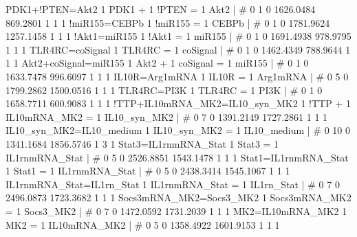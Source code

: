 PDK1+!PTEN=Akt2                                     	1 PDK1 + 1 !PTEN = 1 Akt2 	| 	# 	0              1              0      1626.0484       869.2801              1              1              1 
!miR155=CEBPb                                       	1 !miR155 = 1 CEBPb 	| 	# 	0              1              0      1781.9624      1257.1458              1              1              1 
!Akt1=miR155                                        	1 !Akt1 = 1 miR155 	| 	# 	0              1              0      1691.4938       978.9795              1              1              1 
TLR4RC=coSignal                                     	1 TLR4RC = 1 coSignal 	| 	# 	0              1              0      1462.4349       788.9644              1              1              1 
Akt2+coSignal=miR155                                	1 Akt2 + 1 coSignal = 1 miR155 	| 	# 	0              1              0      1633.7478       996.6097              1              1              1 
IL10R=Arg1mRNA                                      	1 IL10R = 1 Arg1mRNA 	| 	# 	0              5              0      1799.2862      1500.0516              1              1              1 
TLR4RC=PI3K                                         	1 TLR4RC = 1 PI3K 	| 	# 	0              1              0      1658.7711       600.9083              1              1              1 
!TTP+IL10mRNA_MK2=IL10_syn_MK2                      	1 !TTP + 1 IL10mRNA_MK2 = 1 IL10_syn_MK2 	| 	# 	0              7              0      1391.2149      1727.2861              1              1              1 
IL10_syn_MK2=IL10_medium                            	1 IL10_syn_MK2 = 1 IL10_medium 	| 	# 	0             10              0      1341.1684      1856.5746              1              3              1 
Stat3=IL1rnmRNA_Stat                                	1 Stat3 = 1 IL1rnmRNA_Stat 	| 	# 	0              5              0      2526.8851      1543.1478              1              1              1 
Stat1=IL1rnmRNA_Stat                                	1 Stat1 = 1 IL1rnmRNA_Stat 	| 	# 	0              5              0      2438.3414      1545.1067              1              1              1 
IL1rnmRNA_Stat=IL1rn_Stat                           	1 IL1rnmRNA_Stat = 1 IL1rn_Stat 	| 	# 	0              7              0      2496.0873      1723.3682              1              1              1 
Socs3mRNA_MK2=Socs3_MK2                             	1 Socs3mRNA_MK2 = 1 Socs3_MK2 	| 	# 	0              7              0      1472.0592      1731.2039              1              1              1 
MK2=IL10mRNA_MK2                                    	1 MK2 = 1 IL10mRNA_MK2 	| 	# 	0              5              0      1358.4922      1601.9153              1              1              1 
